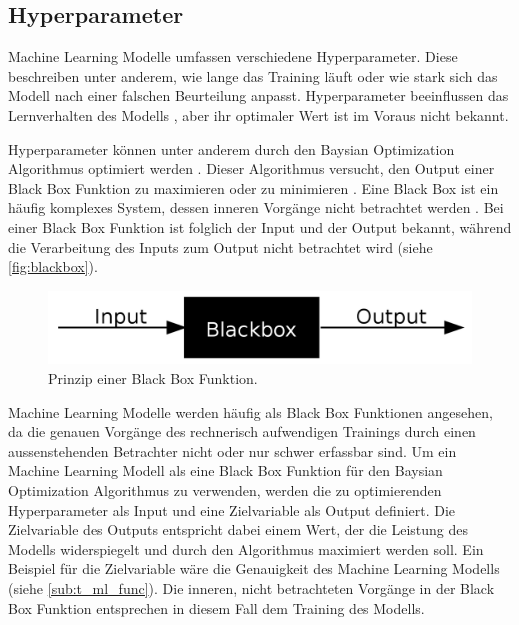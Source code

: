 \newpage
 
\subsection{Hyperparameter}\label{sub:t_ml_hyper}
Machine Learning Modelle umfassen verschiedene Hyperparameter. Diese beschreiben
unter anderem, wie lange das Training läuft oder wie stark sich das Modell nach
einer falschen Beurteilung anpasst. Hyperparameter beeinflussen das
Lernverhalten des Modells \cite{nyuytiymbiy_parameters_2022}, aber ihr
optimaler Wert ist im Voraus nicht bekannt.
 
Hyperparameter können unter anderem durch den Baysian Optimization Algorithmus
optimiert werden \cite{agnihotri_exploring_2020}. Dieser Algorithmus versucht,
den Output einer Black Box Funktion zu maximieren oder zu minimieren \cite[S.
15]{garnett_bayesian_2022}. Eine Black Box ist ein häufig komplexes System,
dessen inneren Vorgänge nicht betrachtet werden \cite{noauthor_black_2021}. Bei
einer Black Box Funktion ist folglich der Input und der Output bekannt, während
die Verarbeitung des Inputs zum Output nicht betrachtet wird (siehe
\autoref{fig:blackbox}).
 
\begin{figure}[!ht]
   \centering
   \includegraphics[width=\textwidth-2cm]{images/theorie/blackbox.png}
   \caption{Prinzip einer Black Box Funktion. \cite{noauthor_black_2021}}\label{fig:blackbox}
\end{figure}
 
Machine Learning Modelle werden häufig als Black Box Funktionen angesehen, da
die genauen Vorgänge des rechnerisch aufwendigen Trainings durch einen
aussenstehenden Betrachter nicht oder nur schwer erfassbar sind. Um ein Machine
Learning Modell als eine Black Box Funktion für den Baysian Optimization
Algorithmus zu verwenden, werden die zu optimierenden Hyperparameter als Input
und eine Zielvariable als Output definiert. Die Zielvariable des Outputs
entspricht dabei einem Wert, der die Leistung des Modells widerspiegelt und
durch den Algorithmus maximiert werden soll. Ein Beispiel für die Zielvariable
wäre die Genauigkeit des Machine Learning Modells (siehe \ref{sub:t_ml_func}).
Die inneren, nicht betrachteten Vorgänge in der Black Box Funktion entsprechen
in diesem Fall dem Training des Modells.
 
